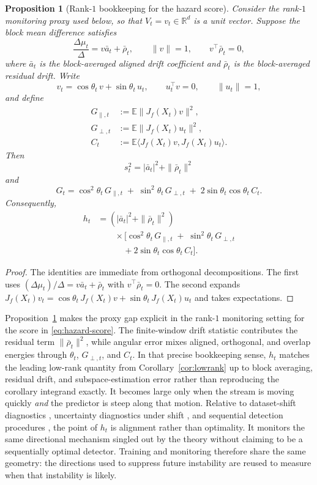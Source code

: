 \documentclass[conference]{IEEEtran}
\newtheorem{proposition}{Proposition}
\newcommand{\E}{\mathbb{E}}
\newcommand{\R}{\mathbb{R}}
\begin{document}
\begin{proposition}[Rank-$1$ bookkeeping for the hazard score]
\label{prop:hazard}
Consider the rank-$1$ monitoring proxy used below, so that $V_t=v_t\in\R^d$ is a unit vector. Suppose the block mean difference satisfies
\[
\frac{\Delta\mu_t}{\Delta}=v\bar a_t+\bar\rho_t,
\qquad
\|v\|=1,
\qquad
v^\top \bar\rho_t=0,
\]
where $\bar a_t$ is the block-averaged aligned drift coefficient and $\bar\rho_t$ is the block-averaged residual drift. Write
\[
v_t=\cos\theta_t\,v+\sin\theta_t\,u_t,
\qquad
u_t^\top v=0,
\qquad
\|u_t\|=1,
\]
and define
\[
\begin{aligned}
G_{\parallel,t}&:=\E\|J_f(X_t)v\|^2, \\
G_{\perp,t}&:=\E\|J_f(X_t)u_t\|^2, \\
C_t&:=\E\langle J_f(X_t)v,J_f(X_t)u_t\rangle.
\end{aligned}
\]
Then
\[
s_t^2=|\bar a_t|^2+\|\bar\rho_t\|^2
\]
and
\[
G_t=\cos^2\theta_t\,G_{\parallel,t}
\;+\;
\sin^2\theta_t\,G_{\perp,t}
\;+\;
2\sin\theta_t\cos\theta_t\,C_t.
\]
Consequently,
\[
\begin{aligned}
h_t&=(|\bar a_t|^2+\|\bar\rho_t\|^2) \\
&\qquad\times
\bigl[
\cos^2\theta_t\,G_{\parallel,t}
\;+\;
\sin^2\theta_t\,G_{\perp,t}
\\
&\qquad\quad+
2\sin\theta_t\cos\theta_t\,C_t
\bigr].
\end{aligned}
\]
\end{proposition}

\begin{proof}
The identities are immediate from orthogonal decompositions. The first uses $(\Delta\mu_t)/\Delta=v\bar a_t+\bar\rho_t$ with $v^\top\bar\rho_t=0$. The second expands $J_f(X_t)v_t=\cos\theta_t\,J_f(X_t)v+\sin\theta_t\,J_f(X_t)u_t$ and takes expectations.
\end{proof}

Proposition~\ref{prop:hazard} makes the proxy gap explicit in the rank-$1$ monitoring setting for the score in \eqref{eq:hazard-score}. The finite-window drift statistic contributes the residual term $\|\bar\rho_t\|^2$, while angular error mixes aligned, orthogonal, and overlap energies through $\theta_t$, $G_{\perp,t}$, and $C_t$. In that precise bookkeeping sense, $h_t$ matches the leading low-rank quantity from Corollary~\ref{cor:lowrank} up to block averaging, residual drift, and subspace-estimation error rather than reproducing the corollary integrand exactly. It becomes large only when the stream is moving quickly \emph{and} the predictor is steep along that motion. Relative to dataset-shift diagnostics \cite{rabanser-shift}, uncertainty diagnostics under shift \cite{ovadia-shift}, and sequential detection procedures \cite{wu-rscusum,cao-xie-allerton2015,cooper-allerton2024}, the point of $h_t$ is alignment rather than optimality. It monitors the same directional mechanism singled out by the theory without claiming to be a sequentially optimal detector.
Training and monitoring therefore share the same geometry: the directions used to suppress future instability are reused to measure when that instability is likely.
\end{document}
